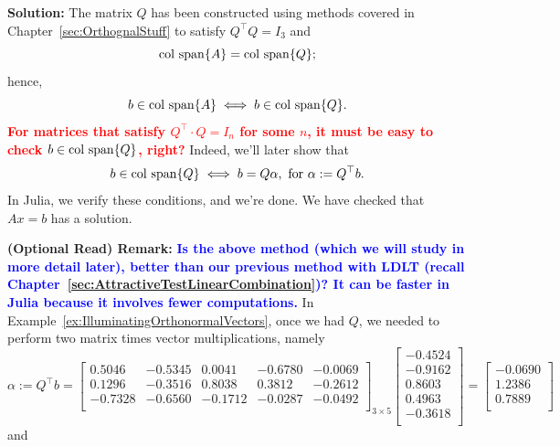 {\bf Solution:} The matrix $Q$ has been constructed using methods covered in Chapter~\ref{sec:OrthognalStuff} to satisfy $Q^\top Q = I_3$ and 
$$ \mathrm{col~span} \{ A \} = \mathrm{col~span} \{ Q \};$$
hence, 
$$b \in \mathrm{col~span} \{ A \} \iff b \in \mathrm{col~span} \{ Q \}. $$
\textcolor{red}{\bf For matrices that satisfy $Q^\top \cdot Q = I_n$ for some $n$, it must be easy to check $b \in \mathrm{col~span} \{ Q \}$, right?} Indeed, we'll later show that
$$  b \in \mathrm{col~span} \{ Q \} \iff b =  Q \alpha, \text{ for } \alpha := Q^\top b.$$
In Julia, we verify these conditions, and we're done. We have checked that $Ax = b$ has a solution.
\Qed

\vspace{.5cm}
 
\textbf{(Optional Read) Remark:} \textcolor{blue}{\bf Is the above method (which we will study in more detail later), better than our previous method with LDLT (recall Chapter~\ref{sec:AttractiveTestLinearCombination})? It can be faster in Julia because it involves fewer computations.} In Example~\ref{ex:IlluminatingOrthonormalVectors}, once we had $Q$, we needed to perform two matrix times vector multiplications, namely
$$ 
\alpha:=Q^\top b = \left[
\begin{array}{rrrrr}
0.5046 & -0.5345 & 0.0041 & -0.6780 & -0.0069 \\
0.1296 & -0.3516 & 0.8038 & 0.3812 & -0.2612 \\
-0.7328 & -0.6560 & -0.1712 & -0.0287 & -0.0492 \\
\end{array}
\right]_{3 \times 5} \left[
\begin{array}{r}
-0.4524 \\
-0.9162 \\
0.8603 \\
0.4963 \\
-0.3618 \\
\end{array}
\right]=  \left[
\begin{array}{r}
-0.0690 \\
1.2386 \\
0.7889 \\
\end{array}
\right] 
$$
and 
